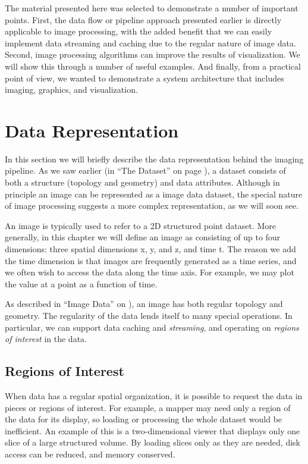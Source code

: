 The material presented here was selected to demonstrate a number of important points. First, the data flow or pipeline approach presented earlier is directly applicable to image processing, with the added benefit that we can easily implement data streaming and caching due to the regular nature of image data. Second, image processing algorithms can improve the results of visualization. We will show this through a number of useful examples. And finally, from a practical point of view, we wanted to demonstrate a system architecture that includes imaging, graphics, and visualization.

\section{Data Representation}

In this section we will briefly describe the data representation behind the imaging pipeline. As we saw earlier (in ``The Dataset'' on page \pageref{sec:dataset}), a dataset consists of both a structure (topology and geometry) and data attributes. Although in principle an image can be represented as a image data dataset, the special nature of image processing suggests a more complex representation, as we will soon see.

An image is typically used to refer to a 2D structured point dataset. More generally, in this chapter we will define an image as consisting of up to four dimensions: three spatial dimensions x, y, and z, and time t. The reason we add the time dimension is that images are frequently generated as a time series, and we often wish to access the data along the time axis. For example, we may plot the value at a point as a function of time.

As described in ``Image Data'' on \pageref{subsec:image_data}), an image has both regular topology and geometry. The regularity of the data lends itself to many special operations. In particular, we can support data caching and \emph{streaming}, and operating on \emph{regions of interest} in the data.

\subsection{Regions of Interest}

When data has a regular spatial organization, it is possible to request the data in pieces or regions of interest. For example, a mapper may need only a region of the data for its display, so loading or processing the whole dataset would be inefficient. An example of this is a two-dimensional viewer that displays only one slice of a large structured volume. By loading slices only as they are needed, disk access can be reduced, and memory conserved.

